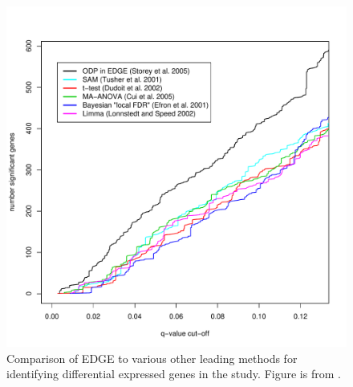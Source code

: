 \documentclass{article}
\begin{document}
\begin{figure}[ht]
\begin{center}
\includegraphics[scale=.50]{edgecomp.pdf}
\end{center}
\caption{Comparison of EDGE to various other leading methods for identifying differential expressed genes in the \cite{hedenfalk:2001} study. Figure is from \cite{leek2005}.}
\label{fig:test}
\end{figure}

\end{document}
